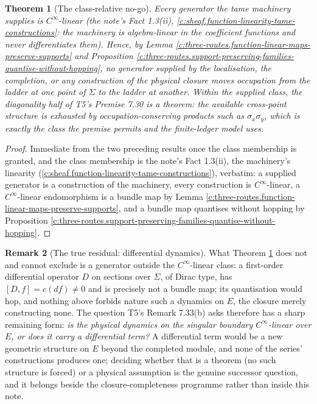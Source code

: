 \documentclass[11pt]{article}
\newtheorem{theorem}{Theorem}[section]
\theoremstyle{definition}
\newtheorem{remark}[theorem]{Remark}
\theoremstyle{plain}
\providecommand{\Sig}{}\renewcommand{\Sig}{\Sigma}
\begin{document}
\begin{theorem}[The class-relative no-go]\label{c:three-routes.class-relative-no-go}
Every generator the tame machinery supplies is $C^\infty$-linear (the note's Fact 1.3(ii), \ref{c:sheaf.function-linearity-tame-constructions}: the machinery is algebra-linear in the coefficient functions and never differentiates them). Hence, by Lemma \ref{c:three-routes.function-linear-maps-preserve-supports} and Proposition \ref{c:three-routes.support-preserving-families-quantise-without-hopping}, no generator supplied by the localisation, the completion, or any construction of the physical closure moves occupation from the ladder at one point of $\Sig$ to the ladder at another. Within the supplied class, the diagonality half of T5's Premise 7.30 is a theorem: the available cross-point structure is exhausted by occupation-conserving products such as $\sigma_x\sigma_y$, which is exactly the class the premise permits and the finite-ledger model uses.
\end{theorem}
\begin{proof}
Immediate from the two preceding results once the class membership is granted, and the class membership is the note's Fact 1.3(ii), the machinery's linearity (\ref{c:sheaf.function-linearity-tame-constructions}), verbatim: a supplied generator is a construction of the machinery, every construction is $C^\infty$-linear, a $C^\infty$-linear endomorphism is a bundle map by Lemma \ref{c:three-routes.function-linear-maps-preserve-supports}, and a bundle map quantises without hopping by Proposition \ref{c:three-routes.support-preserving-families-quantise-without-hopping}.

\end{proof}

\begin{remark}[The true residual: differential dynamics]\label{c:note.three-routes.true-residual-differential-dynamics}
What Theorem \ref{c:three-routes.class-relative-no-go} does not and cannot exclude is a generator outside the $C^\infty$-linear class: a first-order differential operator $D$ on sections over $\Sig$, of Dirac type, has $[D, f] = c(df) \neq 0$ and is precisely not a bundle map; its quantisation would hop, and nothing above forbids nature such a dynamics on $E$, the closure merely constructing none. The question T5's Remark 7.33(b) asks therefore has a sharp remaining form: \emph{is the physical dynamics on the singular boundary $C^\infty$-linear over $E$, or does it carry a differential term?} A differential term would be a new geometric structure on $E$ beyond the completed module, and none of the series' constructions produces one; deciding whether that is a theorem (no such structure is forced) or a physical assumption is the genuine successor question, and it belongs beside the closure-completeness programme rather than inside this note.
\end{remark}
\end{document}
